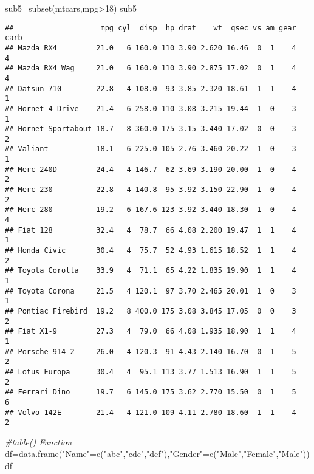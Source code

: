 \documentclass[
]{article}
\newenvironment{Shaded}{\begin{snugshade}}{\end{snugshade}}
\newcommand{\CommentTok}[1]{\textcolor[rgb]{0.56,0.35,0.01}{\textit{#1}}}
\newcommand{\DecValTok}[1]{\textcolor[rgb]{0.00,0.00,0.81}{#1}}
\newcommand{\FunctionTok}[1]{\textcolor[rgb]{0.00,0.00,0.00}{#1}}
\newcommand{\NormalTok}[1]{#1}
\newcommand{\OtherTok}[1]{\textcolor[rgb]{0.56,0.35,0.01}{#1}}
\newcommand{\SpecialCharTok}[1]{\textcolor[rgb]{0.00,0.00,0.00}{#1}}
\newcommand{\StringTok}[1]{\textcolor[rgb]{0.31,0.60,0.02}{#1}}
\begin{document}
\begin{Shaded}
\begin{Highlighting}[]
\NormalTok{sub5}\OtherTok{=}\FunctionTok{subset}\NormalTok{(mtcars,mpg}\SpecialCharTok{\textgreater{}}\DecValTok{18}\NormalTok{)}
\NormalTok{sub5}
\end{Highlighting}
\end{Shaded}

\begin{verbatim}
##                    mpg cyl  disp  hp drat    wt  qsec vs am gear carb
## Mazda RX4         21.0   6 160.0 110 3.90 2.620 16.46  0  1    4    4
## Mazda RX4 Wag     21.0   6 160.0 110 3.90 2.875 17.02  0  1    4    4
## Datsun 710        22.8   4 108.0  93 3.85 2.320 18.61  1  1    4    1
## Hornet 4 Drive    21.4   6 258.0 110 3.08 3.215 19.44  1  0    3    1
## Hornet Sportabout 18.7   8 360.0 175 3.15 3.440 17.02  0  0    3    2
## Valiant           18.1   6 225.0 105 2.76 3.460 20.22  1  0    3    1
## Merc 240D         24.4   4 146.7  62 3.69 3.190 20.00  1  0    4    2
## Merc 230          22.8   4 140.8  95 3.92 3.150 22.90  1  0    4    2
## Merc 280          19.2   6 167.6 123 3.92 3.440 18.30  1  0    4    4
## Fiat 128          32.4   4  78.7  66 4.08 2.200 19.47  1  1    4    1
## Honda Civic       30.4   4  75.7  52 4.93 1.615 18.52  1  1    4    2
## Toyota Corolla    33.9   4  71.1  65 4.22 1.835 19.90  1  1    4    1
## Toyota Corona     21.5   4 120.1  97 3.70 2.465 20.01  1  0    3    1
## Pontiac Firebird  19.2   8 400.0 175 3.08 3.845 17.05  0  0    3    2
## Fiat X1-9         27.3   4  79.0  66 4.08 1.935 18.90  1  1    4    1
## Porsche 914-2     26.0   4 120.3  91 4.43 2.140 16.70  0  1    5    2
## Lotus Europa      30.4   4  95.1 113 3.77 1.513 16.90  1  1    5    2
## Ferrari Dino      19.7   6 145.0 175 3.62 2.770 15.50  0  1    5    6
## Volvo 142E        21.4   4 121.0 109 4.11 2.780 18.60  1  1    4    2
\end{verbatim}

\begin{Shaded}
\begin{Highlighting}[]
\CommentTok{\#table() Function}
\NormalTok{df}\OtherTok{=}\FunctionTok{data.frame}\NormalTok{(}\StringTok{"Name"}\OtherTok{=}\FunctionTok{c}\NormalTok{(}\StringTok{"abc"}\NormalTok{,}\StringTok{"cde"}\NormalTok{,}\StringTok{"def"}\NormalTok{),}\StringTok{"Gender"}\OtherTok{=}\FunctionTok{c}\NormalTok{(}\StringTok{"Male"}\NormalTok{,}\StringTok{"Female"}\NormalTok{,}\StringTok{"Male"}\NormalTok{))}
\NormalTok{df}
\end{Highlighting}
\end{Shaded}
\end{document}
